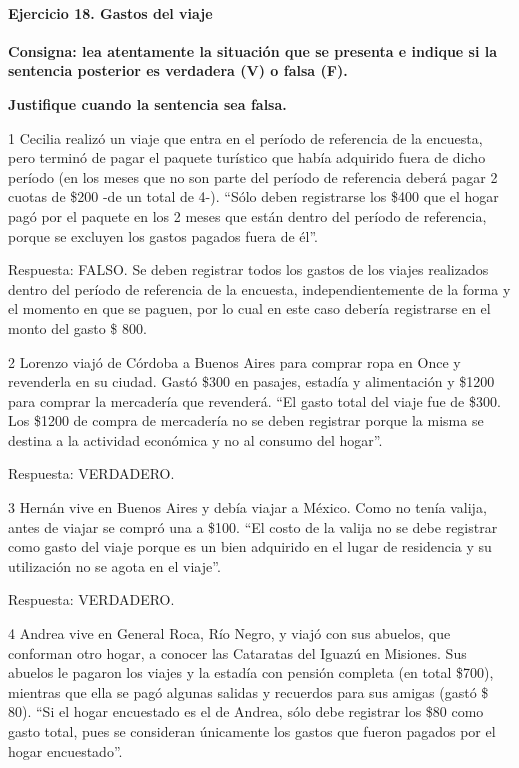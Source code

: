 \documentclass[
  openany]{book}
\begin{document}
\hypertarget{ejercicio-18.-gastos-del-viaje-1}{%
\paragraph{Ejercicio 18. Gastos del viaje}\label{ejercicio-18.-gastos-del-viaje-1}}

\textbf{Consigna: lea atentamente la situación que se presenta e indique si la sentencia posterior es verdadera (V) o falsa (F).}

\textbf{Justifique cuando la sentencia sea falsa.}

1 Cecilia realizó un viaje que entra en el período de referencia de la encuesta, pero terminó de pagar el paquete turístico que había adquirido fuera de dicho período (en los meses que no son parte del período de referencia deberá pagar 2 cuotas de \$200 -de un total de 4-).
``Sólo deben registrarse los \$400 que el hogar pagó por el paquete en los 2 meses que están dentro del período de referencia, porque se excluyen los gastos pagados fuera de él''.

Respuesta: FALSO. Se deben registrar todos los gastos de los viajes realizados dentro del período de referencia de la encuesta, independientemente de la forma y el momento en que se paguen, por lo cual en este caso debería registrarse en el monto del gasto \$ 800.

2 Lorenzo viajó de Córdoba a Buenos Aires para comprar ropa en Once y revenderla en su ciudad. Gastó \$300 en pasajes, estadía y alimentación y \$1200 para comprar la mercadería que revenderá.
``El gasto total del viaje fue de \$300. Los \$1200 de compra de mercadería no se deben registrar porque la misma se destina a la actividad económica y no al consumo del hogar''.

Respuesta: VERDADERO.

3 Hernán vive en Buenos Aires y debía viajar a México. Como no tenía valija, antes de viajar se compró una a \$100.
``El costo de la valija no se debe registrar como gasto del viaje porque es un bien adquirido en el lugar de residencia y su utilización no se agota en el viaje''.

Respuesta: VERDADERO.

4 Andrea vive en General Roca, Río Negro, y viajó con sus abuelos, que conforman otro hogar, a conocer las Cataratas del Iguazú en Misiones. Sus abuelos le pagaron los viajes y la estadía con pensión completa (en total \$700), mientras que ella se pagó algunas salidas y recuerdos para sus amigas (gastó \$ 80).
``Si el hogar encuestado es el de Andrea, sólo debe registrar los \$80 como gasto total, pues se consideran únicamente los gastos que fueron pagados por el hogar encuestado''.
\end{document}
